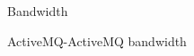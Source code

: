 \documentclass{thesis}
\begin{document}
\begin{figure}[tb] 
\centering
\caption{Bandwidth}
\label{bandwidth}
\end{figure}

\begin{figure}[tb] 
\centering
\caption{ActiveMQ-ActiveMQ bandwidth}
\label{activemq-activemq-bandwidth}
\end{figure}
\end{document}
